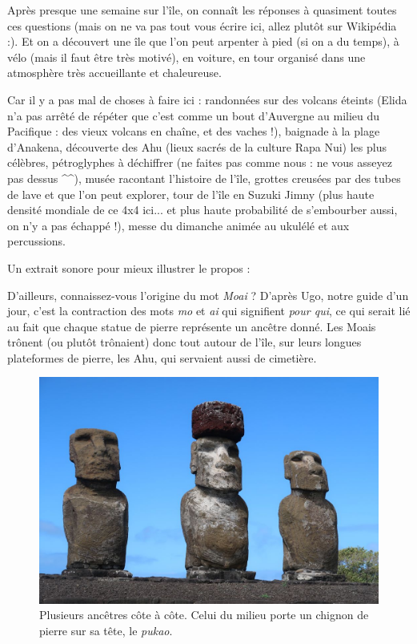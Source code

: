 Après presque une semaine sur l'île, on connaît les réponses à quasiment
toutes ces questions (mais on ne va pas tout vous écrire ici, allez
plutôt sur Wikipédia :). Et on a découvert une île que l'on peut
arpenter à pied (si on a du temps), à vélo (mais il faut être très
motivé), en voiture, en tour organisé dans une atmosphère très
accueillante et chaleureuse.

Car il y a pas mal de choses à faire ici : randonnées sur des volcans
éteints (Elida n'a pas arrêté de répéter que c'est comme un bout
d'Auvergne au milieu du Pacifique : des vieux volcans en chaîne, et des
vaches !), baignade à la plage d'Anakena, découverte des Ahu (lieux
sacrés de la culture Rapa Nui) les plus célèbres, pétroglyphes à
déchiffrer (ne faites pas comme nous : ne vous asseyez pas dessus
\^{}\^{}), musée racontant l'histoire de l'île, grottes creusées par des
tubes de lave et que l'on peut explorer, tour de l'île en Suzuki Jimny
(plus haute densité mondiale de ce 4x4 ici... et plus haute probabilité
de s'embourber aussi, on n'y a pas échappé !), messe du dimanche animée
au ukulélé et aux percussions.

Un extrait sonore pour mieux illustrer le propos :

D'ailleurs, connaissez-vous l'origine du mot \emph{Moai} ? D'après Ugo,
notre guide d'un jour, c'est la contraction des mots \emph{mo} et
\emph{ai} qui signifient \emph{pour qui}, ce qui serait lié au fait que
chaque statue de pierre représente un ancêtre donné. Les Moais trônent
(ou plutôt trônaient) donc tout autour de l'île, sur leurs longues
plateformes de pierre, les Ahu, qui servaient aussi de cimetière.

\begin{figure}
\centering
\includegraphics{images/20180827_moai.JPG}
\caption{Plusieurs ancêtres côte à côte. Celui du milieu porte un
chignon de pierre sur sa tête, le \emph{pukao}.}
\end{figure}

